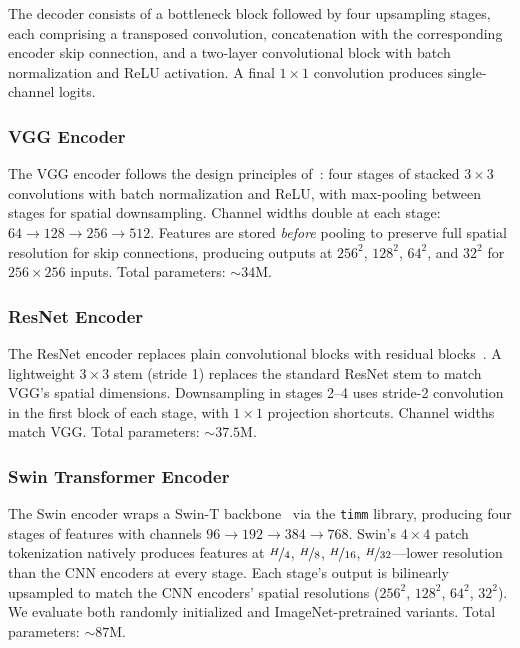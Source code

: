 \documentclass{article}
\begin{document}
The decoder consists of a bottleneck block followed by four upsampling stages, each comprising a transposed convolution, concatenation with the corresponding encoder skip connection, and a two-layer convolutional block with batch normalization and ReLU activation. A final $1\times1$ convolution produces single-channel logits.

\subsubsection{VGG Encoder}

The VGG encoder follows the design principles of~\cite{simonyan2014vgg}: four stages of stacked $3\times3$ convolutions with batch normalization and ReLU, with max-pooling between stages for spatial downsampling. Channel widths double at each stage: $64 \to 128 \to 256 \to 512$. Features are stored \emph{before} pooling to preserve full spatial resolution for skip connections, producing outputs at $256^2$, $128^2$, $64^2$, and $32^2$ for $256\times256$ inputs. Total parameters: ${\sim}34$M.

\subsubsection{ResNet Encoder}

The ResNet encoder replaces plain convolutional blocks with residual blocks~\cite{he2016resnet}. A lightweight $3\times3$ stem (stride 1) replaces the standard ResNet stem to match VGG's spatial dimensions. Downsampling in stages 2--4 uses stride-2 convolution in the first block of each stage, with $1\times1$ projection shortcuts. Channel widths match VGG. Total parameters: ${\sim}37.5$M.

\subsubsection{Swin Transformer Encoder}

The Swin encoder wraps a Swin-T backbone~\cite{liu2021swin} via the \texttt{timm} library, producing four stages of features with channels $96 \to 192 \to 384 \to 768$. Swin's $4\times4$ patch tokenization natively produces features at $\nicefrac{H}{4}$, $\nicefrac{H}{8}$, $\nicefrac{H}{16}$, $\nicefrac{H}{32}$---lower resolution than the CNN encoders at every stage. Each stage's output is bilinearly upsampled to match the CNN encoders' spatial resolutions ($256^2$, $128^2$, $64^2$, $32^2$). We evaluate both randomly initialized and ImageNet-pretrained variants. Total parameters: ${\sim}87$M.
\end{document}
